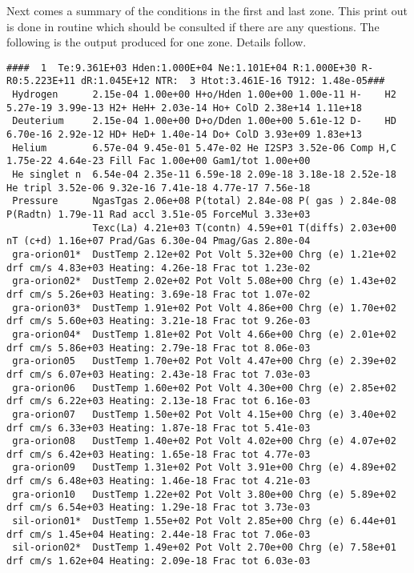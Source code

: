 Next comes a summary of the conditions in the first and last zone.
This print out is done in routine  which should
be consulted if there are any questions.
The following is the output produced for one zone.
Details follow.
{\setverbatimfontsize{\tiny}
\begin{verbatim}
####  1  Te:9.361E+03 Hden:1.000E+04 Ne:1.101E+04 R:1.000E+30 R-R0:5.223E+11 dR:1.045E+12 NTR:  3 Htot:3.461E-16 T912: 1.48e-05###
 Hydrogen      2.15e-04 1.00e+00 H+o/Hden 1.00e+00 1.00e-11 H-    H2 5.27e-19 3.99e-13 H2+ HeH+ 2.03e-14 Ho+ ColD 2.38e+14 1.11e+18
 Deuterium     2.15e-04 1.00e+00 D+o/Dden 1.00e+00 5.61e-12 D-    HD 6.70e-16 2.92e-12 HD+ HeD+ 1.40e-14 Do+ ColD 3.93e+09 1.83e+13
 Helium        6.57e-04 9.45e-01 5.47e-02 He I2SP3 3.52e-06 Comp H,C 1.75e-22 4.64e-23 Fill Fac 1.00e+00 Gam1/tot 1.00e+00
 He singlet n  6.54e-04 2.35e-11 6.59e-18 2.09e-18 3.18e-18 2.52e-18 He tripl 3.52e-06 9.32e-16 7.41e-18 4.77e-17 7.56e-18
 Pressure      NgasTgas 2.06e+08 P(total) 2.84e-08 P( gas ) 2.84e-08 P(Radtn) 1.79e-11 Rad accl 3.51e-05 ForceMul 3.33e+03
               Texc(La) 4.21e+03 T(contn) 4.59e+01 T(diffs) 2.03e+00 nT (c+d) 1.16e+07 Prad/Gas 6.30e-04 Pmag/Gas 2.80e-04
 gra-orion01*  DustTemp 2.12e+02 Pot Volt 5.32e+00 Chrg (e) 1.21e+02 drf cm/s 4.83e+03 Heating: 4.26e-18 Frac tot 1.23e-02
 gra-orion02*  DustTemp 2.02e+02 Pot Volt 5.08e+00 Chrg (e) 1.43e+02 drf cm/s 5.26e+03 Heating: 3.69e-18 Frac tot 1.07e-02
 gra-orion03*  DustTemp 1.91e+02 Pot Volt 4.86e+00 Chrg (e) 1.70e+02 drf cm/s 5.60e+03 Heating: 3.21e-18 Frac tot 9.26e-03
 gra-orion04*  DustTemp 1.81e+02 Pot Volt 4.66e+00 Chrg (e) 2.01e+02 drf cm/s 5.86e+03 Heating: 2.79e-18 Frac tot 8.06e-03
 gra-orion05   DustTemp 1.70e+02 Pot Volt 4.47e+00 Chrg (e) 2.39e+02 drf cm/s 6.07e+03 Heating: 2.43e-18 Frac tot 7.03e-03
 gra-orion06   DustTemp 1.60e+02 Pot Volt 4.30e+00 Chrg (e) 2.85e+02 drf cm/s 6.22e+03 Heating: 2.13e-18 Frac tot 6.16e-03
 gra-orion07   DustTemp 1.50e+02 Pot Volt 4.15e+00 Chrg (e) 3.40e+02 drf cm/s 6.33e+03 Heating: 1.87e-18 Frac tot 5.41e-03
 gra-orion08   DustTemp 1.40e+02 Pot Volt 4.02e+00 Chrg (e) 4.07e+02 drf cm/s 6.42e+03 Heating: 1.65e-18 Frac tot 4.77e-03
 gra-orion09   DustTemp 1.31e+02 Pot Volt 3.91e+00 Chrg (e) 4.89e+02 drf cm/s 6.48e+03 Heating: 1.46e-18 Frac tot 4.21e-03
 gra-orion10   DustTemp 1.22e+02 Pot Volt 3.80e+00 Chrg (e) 5.89e+02 drf cm/s 6.54e+03 Heating: 1.29e-18 Frac tot 3.73e-03
 sil-orion01*  DustTemp 1.55e+02 Pot Volt 2.85e+00 Chrg (e) 6.44e+01 drf cm/s 1.45e+04 Heating: 2.44e-18 Frac tot 7.06e-03
 sil-orion02*  DustTemp 1.49e+02 Pot Volt 2.70e+00 Chrg (e) 7.58e+01 drf cm/s 1.62e+04 Heating: 2.09e-18 Frac tot 6.03e-03

\end{verbatim}}
